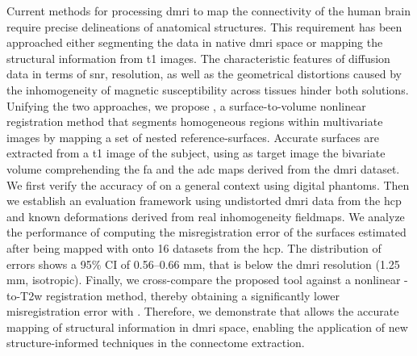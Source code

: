 Current methods for processing \gls*{dmri} to map the connectivity of the human brain
  require precise delineations of anatomical structures.
This requirement has been approached  either segmenting the data in
  native \gls*{dmri} space or mapping the structural information from \gls*{t1} images.
The characteristic features of diffusion data in terms of \acrlong*{snr}, resolution, as well
  as the geometrical distortions caused by the inhomogeneity of magnetic susceptibility
  across tissues hinder both solutions.
Unifying the two approaches, we propose \regseg{}, a surface-to-volume nonlinear
  registration method that segments homogeneous regions within multivariate images by mapping
  a set of nested reference-surfaces.
Accurate surfaces are extracted from a \gls*{t1} image of the subject, using as target image
  the bivariate volume comprehending the \gls*{fa} and the \gls*{adc} maps derived from the
  \gls*{dmri} dataset.
We first verify the accuracy of \regseg{} on a general context using digital phantoms.
Then we establish an evaluation framework using undistorted \gls*{dmri} data from the \gls*{hcp}
  and known deformations derived from real inhomogeneity fieldmaps.
We analyze the performance of \regseg{} computing the misregistration error of the surfaces estimated
  after being mapped with \regseg{} onto 16 datasets from the \gls*{hcp}.
The distribution of errors shows a 95\% CI of 0.56--0.66 mm, that is below the \gls*{dmri}
  resolution (1.25 mm, isotropic).
Finally, we cross-compare the proposed tool against a nonlinear \lowb{}-to-T2w registration
  method, thereby obtaining a significantly lower misregistration error with \regseg{}.
Therefore, we demonstrate that \regseg{} allows the accurate mapping of structural information
  in \gls*{dmri} space, enabling the application of new structure-informed techniques in
  the connectome extraction.